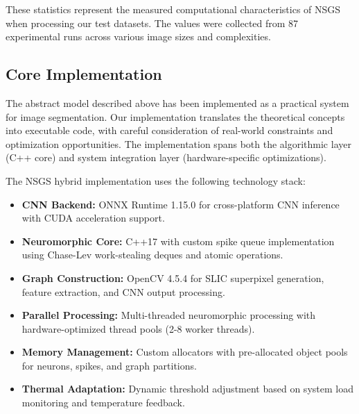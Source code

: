\documentclass[conference]{IEEEtran}
\begin{document}
\newpage
\begin{table}[t]
\caption{NSGS Neural Processing Statistics}
\label{tab:neural-statistics}
\centering
{}
\end{table}

These statistics represent the measured computational characteristics of NSGS when processing our test datasets. The values were collected from 87 experimental runs across various image sizes and complexities.

\subsection{Core Implementation}
The abstract model described above has been implemented as a practical system for image segmentation. Our implementation translates the theoretical concepts into executable code, with careful consideration of real-world constraints and optimization opportunities. The implementation spans both the algorithmic layer (C++ core) and system integration layer (hardware-specific optimizations).

The NSGS hybrid implementation uses the following technology stack:
\begin{itemize}
    \item \textbf{CNN Backend:} ONNX Runtime 1.15.0 for cross-platform CNN inference with CUDA acceleration support.
    \item \textbf{Neuromorphic Core:} C++17 with custom spike queue implementation using Chase-Lev work-stealing deques and atomic operations.
    \item \textbf{Graph Construction:} OpenCV 4.5.4 for SLIC superpixel generation, feature extraction, and CNN output processing.
    \item \textbf{Parallel Processing:} Multi-threaded neuromorphic processing with hardware-optimized thread pools (2-8 worker threads).
    \item \textbf{Memory Management:} Custom allocators with pre-allocated object pools for neurons, spikes, and graph partitions.
    \item \textbf{Thermal Adaptation:} Dynamic threshold adjustment based on system load monitoring and temperature feedback.
\end{itemize}
\end{document}

